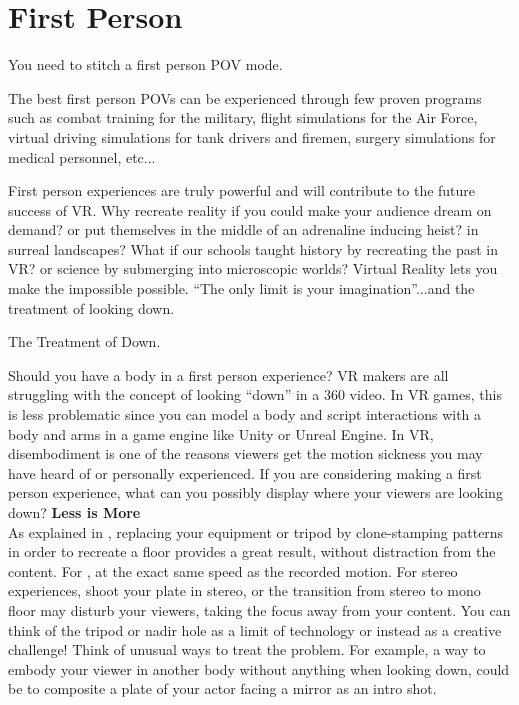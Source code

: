 \chapter{First Person}
\pagecolor{white}
\label{chap:44}
\begin{fullwidth}

\problem

{\large You need to stitch a first person POV mode. \par}

The best first person POVs can be experienced through few proven programs such as combat training for the military, flight simulations for the Air Force, virtual driving simulations for tank drivers and firemen, surgery simulations for medical personnel, etc... 

First person experiences are truly powerful and will contribute to the future success of VR. Why recreate reality if you could make your audience dream on demand? or put themselves in the middle of an adrenaline inducing heist? in surreal landscapes? What if our schools taught history by recreating the past in VR? or science by submerging into microscopic worlds? Virtual Reality lets you make the impossible possible. “The only limit is your imagination”...and the treatment of looking down.

\solution

{\large The Treatment of Down. \par}

Should you have a body in a first person experience? VR makers are all struggling with the concept of looking “down” in a 360 video. In VR games, this is less problematic since you can model a body and script interactions with a body and arms in a game engine like Unity or Unreal Engine. In VR, disembodiment is one of the reasons viewers get the motion sickness you may have heard of or personally experienced. If you are considering making a first person experience, what can you possibly display where your viewers are looking down? 
\clearpage
{\bfseries Less is More}
\\
As explained in \textbf{}, replacing your equipment or tripod by clone-stamping patterns in order to recreate a floor provides a great result, without distraction from the content. For \textbf{}, \textbf{} at the exact same speed as the recorded motion. For stereo experiences, shoot your plate in stereo, or the transition from stereo to mono floor may disturb your viewers, taking the focus away from your content. You can think of the tripod or nadir hole as a limit of technology or instead as a creative challenge! Think of unusual ways to treat the problem. For example, a way to embody your viewer in another body without anything when looking down, could be to composite a plate of your actor facing a mirror as an intro shot.


\end{fullwidth}
